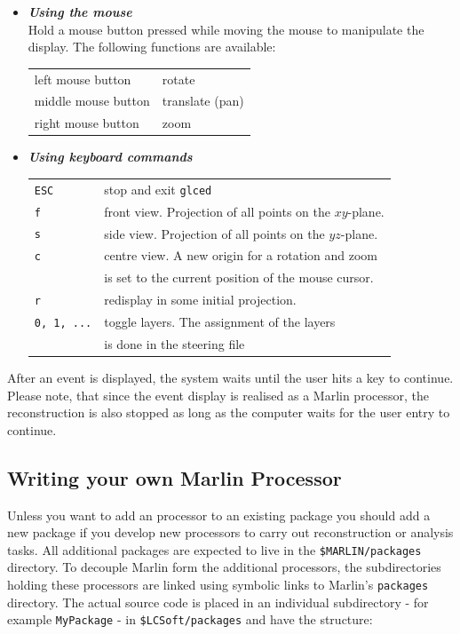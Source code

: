 \begin{itemize}
\item {\em\bf Using the mouse} \\ 
      Hold a mouse button pressed while moving the mouse to 
      manipulate the display. The following functions are available: 

      \begin{center}
      \begin{tabular}{ll}
      left mouse button   & rotate \\
      middle mouse button & translate (pan)\\
      right mouse button  & zoom \\
      \end{tabular}
      \end{center}
\item {\em\bf Using keyboard commands} \\
      \begin{tabular}{ll}
      {\tt ESC} & stop and exit {\tt glced} \\
      {\tt f}   & front view. Projection of all points on the $xy$-plane.\\
      {\tt s}   & side view. Projection of all points on the $yz$-plane. \\
      {\tt c}   & centre view. A new origin for a rotation and zoom \\ 
                & is set to the current position of the mouse cursor.\\
      {\tt r}   & redisplay in some initial projection. \\
      {\tt 0, 1, ...} & toggle layers. The assignment of the layers \\
                      & is done in the steering file \\
      \end{tabular}
\end{itemize}

After an event is displayed, the system waits until the user hits a key
to continue. Please note, that since the event display is realised as a
Marlin processor, the reconstruction is also stopped as long as the computer
waits for the user entry to continue.

\subsection{Writing your own Marlin Processor}

Unless you want to add an processor to an existing package you should add a 
new package if you develop new processors to carry out reconstruction or
analysis tasks. All additional packages are expected to live in the 
{\tt \$MARLIN/packages} directory.
To decouple Marlin form the additional processors, the subdirectories holding 
these processors are linked using symbolic links to Marlin's {\tt packages} 
directory. The actual source code is placed in an individual 
subdirectory - for example {\tt MyPackage} - in {\tt \$LCSoft/packages}
and have the structure:

